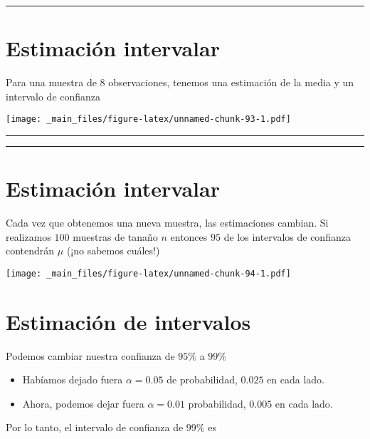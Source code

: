 \documentclass[
]{book}
\begin{document}
\begin{center}\rule{0.5\linewidth}{0.5pt}\end{center}

\hypertarget{estimaciuxf3n-intervalar-4}{%
\section{Estimación intervalar}\label{estimaciuxf3n-intervalar-4}}

Para una muestra de 8 observaciones, tenemos una estimación de la media y un intervalo de confianza

\texttt{[image: \_main\_files/figure-latex/unnamed-chunk-93-1.pdf]}

\begin{center}\rule{0.5\linewidth}{0.5pt}\end{center}

\begin{center}\rule{0.5\linewidth}{0.5pt}\end{center}

\hypertarget{estimaciuxf3n-intervalar-5}{%
\section{Estimación intervalar}\label{estimaciuxf3n-intervalar-5}}

Cada vez que obtenemos una nueva muestra, las estimaciones cambian. Si realizamos \(100\) muestras de tanaño \(n\) entonces \(95%
\) de los intervalos de confianza contendrán \(\mu\) (¡no sabemos cuáles!)

\texttt{[image: \_main\_files/figure-latex/unnamed-chunk-94-1.pdf]}

\hypertarget{estimaciuxf3n-de-intervalos}{%
\section{Estimación de intervalos}\label{estimaciuxf3n-de-intervalos}}

Podemos cambiar nuestra confianza de \(95\%\) a \(99\%\)

\begin{itemize}
\item
  Habíamos dejado fuera \(\alpha=0.05\) de probabilidad, \(0.025\) en cada lado.
\item
  Ahora, podemos dejar fuera \(\alpha=0.01\) probabilidad, \(0.005\) en cada lado.
\end{itemize}

Por lo tanto, el intervalo de confianza de \(99\%\) es
\end{document}
